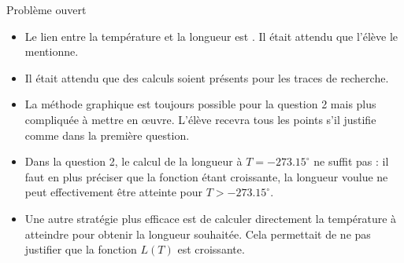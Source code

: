 \begin{EXO}{Problème ouvert}{}

\begin{itemize}
    \item Le lien entre la température et la longueur est . Il était attendu que l'élève le mentionne. 
    \item Il était attendu que des calculs soient présents pour les traces de recherche.
\end{itemize}


\begin{itemize}
    \item La méthode graphique est toujours possible pour la question 2 mais plus compliquée à mettre en \oe uvre. L'élève recevra tous les points s'il justifie comme dans la première question.
    \item Dans la question 2, le calcul de la longueur à $T=\num{-273.15}^\circ$ ne suffit pas : il faut en plus préciser que la fonction étant croissante, la longueur voulue ne peut effectivement être atteinte pour $T>\num{-273.15}^\circ$.
    \item Une autre stratégie plus efficace est de calculer directement la température à atteindre pour obtenir la longueur souhaitée. Cela permettait de ne pas justifier que la fonction $L(T)$ est croissante. 
\end{itemize}

\end{EXO}
